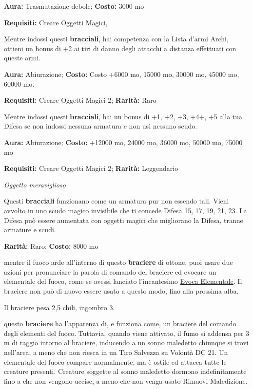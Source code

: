 \begin{multicols}{2}
\textbf{Aura:} Trasmutazione debole; \textbf{Costo:} 3000 mo

\textbf{Requisiti:} Creare Oggetti Magici,

Mentre indossi questi \textbf{bracciali}, hai competenza con la Lista d'armi Archi, ottieni un bonus di +2 ai tiri di danno degli attacchi a distanza effettuati con queste armi.


\textbf{Aura:} Abiurazione; \textbf{Costo:}  Costo +6000 mo, 15000 mo, 30000 mo, 45000 mo, 60000 mo.

\textbf{Requisiti:} Creare Oggetti Magici 2; \textbf{Rarità:} Raro

Mentre indossi questi \textbf{bracciali}, hai un bonus di +1, +2, +3, +4+, +5 alla tua Difesa se non indossi nessuna armatura e non usi nessuno scudo.


\textbf{Aura:} Abiurazione;  \textbf{Costo:}  +12000 mo, 24000 mo, 36000 mo, 50000 mo, 75000 mo

\textbf{Requisiti:} Creare Oggetti Magici 2; \textbf{Rarità:} Leggendario

\emph{Oggetto meraviglioso}

Questi \textbf{bracciali} funzionano come un armatura pur non essendo tali. Vieni avvolto in uno scudo magico invisibile che ti concede Difesa 15, 17, 19, 21, 23. La Difesa può essere aumentata con oggetti magici che migliorano la Difesa, tranne armature e scudi.


\textbf{Rarità:} Raro; \textbf{Costo:} 8000 mo

mentre il fuoco arde all'interno di questo \textbf{braciere} di ottone, puoi usare due azioni per pronunciare la parola di comando del braciere ed evocare un elementale del fuoco, come se avessi lanciato l'incantesimo \hyperlink{Evoca Elementale}{Evoca Elementale}. Il braciere non può di nuovo essere usato a questo modo, fino alla prossima alba.

Il braciere pesa 2,5 chili, ingombro 3.


questo \textbf{braciere} ha l'apparenza di, e funziona come, un braciere del comando degli elementi del fuoco. Tuttavia, quando viene attivato, il fumo si addensa per 3 m di raggio intorno al braciere, inducendo a un sonno maledetto chiunque si trovi nell'area, a meno che non riesca in un Tiro Salvezza su Volontà DC 21. Un elementale del fuoco compare normalmente, ma è ostile ed attacca tutte le creature presenti. Creature soggette al sonno maledetto dormono indefinitamente fino a che non vengono uccise, a meno che non venga usato Rimuovi Maledizione.


\end{multicols}
